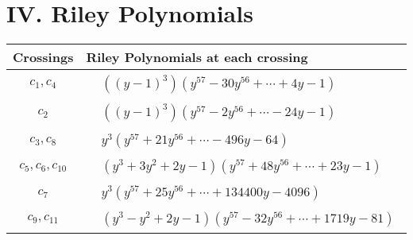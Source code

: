 \documentclass[1p]{elsarticle_modified}
\theoremstyle{definition}
\begin{document}
\centering \section*{ IV. Riley Polynomials}
\begin{tabular}{m{50pt}|m{274pt}}
Crossings & \hspace{64pt}Riley Polynomials at each crossing \\
\hline $$\begin{aligned}c_{1},c_{4}\end{aligned}$$&$\begin{aligned}
&((y-1)^3)(y^{57}-30 y^{56}+\cdots+4 y-1)
\end{aligned}$\\
\hline $$\begin{aligned}c_{2}\end{aligned}$$&$\begin{aligned}
&((y-1)^3)(y^{57}-2 y^{56}+\cdots-24 y-1)
\end{aligned}$\\
\hline $$\begin{aligned}c_{3},c_{8}\end{aligned}$$&$\begin{aligned}
&y^3(y^{57}+21 y^{56}+\cdots-496 y-64)
\end{aligned}$\\
\hline $$\begin{aligned}c_{5},c_{6},c_{10}\end{aligned}$$&$\begin{aligned}
&(y^3+3 y^2+2 y-1)(y^{57}+48 y^{56}+\cdots+23 y-1)
\end{aligned}$\\
\hline $$\begin{aligned}c_{7}\end{aligned}$$&$\begin{aligned}
&y^3(y^{57}+25 y^{56}+\cdots+134400 y-4096)
\end{aligned}$\\
\hline $$\begin{aligned}c_{9},c_{11}\end{aligned}$$&$\begin{aligned}
&(y^3- y^2+2 y-1)(y^{57}-32 y^{56}+\cdots+1719 y-81)
\end{aligned}$\\
\hline
\end{tabular}
\vskip 2pc
\end{document}
